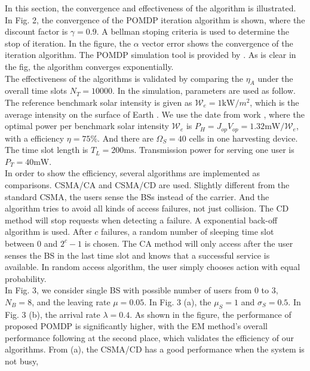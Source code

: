 \documentclass[conference]{IEEEtran}
\begin{document}
In this section, the convergence and effectiveness of the algorithm is illustrated.
In Fig. 2, the convergence of the POMDP iteration algorithm is shown, where the discount factor is \(\gamma = 0.9\).
A bellman stoping criteria is used to determine the stop of iteration.
In the figure, the \(\alpha\) vector error shows the convergence of the iteration algorithm.
The POMDP simulation tool is provided by \cite{pomdptool}.
As is clear in the fig, the algorithm converges exponentially.\\
\indent The effectiveness of the algorithms is validated by comparing the \(\eta_A\)
under the overall time slots \(N_T = 10000\).
In the simulation, parameters are used as follow.
The reference benchmark solar intensity is given as \(\mathcal{W}_e = 1\mbox{kW}/m^2\),
which is the average intensity on the surface of Earth \cite{electric}.
We use the date from work \cite{circuit}, where the optimal power per benchmark solar intensity \(\mathcal{W}_e\)
is \(P_H = J_{op}V_{op} = 1.32\mbox{mW}/\mathcal{W}_e\), with a efficiency \(\eta = 75 \%\).
And there are \(\Omega_S = 40\) cells in one harvesting device.
The time slot length is \(T_L = 200\mbox{ms}\).
Transmission power for serving one user is \(P_T = 40\mbox{mW}\).\\
\indent In order to show the efficiency, several algorithms are implemented as comparisons.
CSMA/CA and CSMA/CD are used.
Slightly different from the standard CSMA, the users sense the BSs instead of the carrier.
And the algorithm tries to avoid all kinds of access failures, not just collision.
The CD method will stop requests when detecting a failure. A exponential back-off algorithm is used.
After \(c\) failures, a random number of sleeping time slot between \(0\) and \(2^c - 1\) is chosen.
The CA method will only access after the user senses the BS in the last time slot
and knows that a successful service is available.
In random access algorithm, the user simply chooses action with equal probability.\\
\indent In Fig. 3, we consider single BS with possible number of users from \(0\) to \(3\), \(N_B = 8\),
and the leaving rate \(\mu = 0.05\).
In Fig. 3 (a), the \(\mu_S = 1\) and \(\sigma_S = 0.5\). In Fig. 3 (b), the arrival rate \(\lambda = 0.4\).
As shown in the figure, the performance of proposed POMDP is significantly higher,
with the EM method's overall performance following at the second place,
which validates the efficiency of our algorithms.
From (a), the CSMA/CD has a good performance when the system is not busy,
\end{document}
